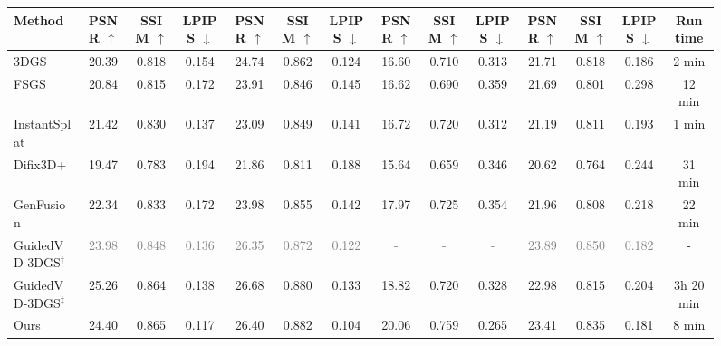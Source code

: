 \documentclass[runningheads]{llncs}
\begin{document}
\begin{figure}[t]
\begin{minipage}{\textwidth}
{\begin{tabular}{lccccccccccccc}
Method
& PSNR $\uparrow$ & SSIM $\uparrow$ & LPIPS $\downarrow$
& PSNR $\uparrow$ & SSIM $\uparrow$ & LPIPS $\downarrow$
& PSNR $\uparrow$ & SSIM $\uparrow$ & LPIPS $\downarrow$
& PSNR $\uparrow$ & SSIM $\uparrow$ & LPIPS $\downarrow$
& Run time \\
\midrule

3DGS & 20.39 & 0.818 & \cellcolor{yellow!25}0.154
& 24.74 & \cellcolor{yellow!25}0.862 & \cellcolor{orange!25}0.124
& 16.60 & 0.710 & 0.313
& 21.71 & \cellcolor{orange!25}0.818 & \cellcolor{orange!25}0.186 
& 2 min \\

FSGS & 20.84 & 0.815 & 0.172
& 23.91 & 0.846 & 0.145
& 16.62 & 0.690 & 0.359
& 21.69 & 0.801 & 0.298 
& 12 min \\

InstantSplat & \cellcolor{yellow!25}21.42 & 0.830 & \cellcolor{orange!25}0.137
& 23.09 & 0.849 & \cellcolor{yellow!25}0.141
& 16.72 & 0.720 & \cellcolor{yellow!25}0.312
& 21.19 & 0.811 & \cellcolor{yellow!25}0.193 
& 1 min \\

Difix3D+ & 19.47 & 0.783 & 0.194
& 21.86 & 0.811 & 0.188
& 15.64 & 0.659 & 0.346
& 20.62 & 0.764 & 0.244 
& 31 min \\

GenFusion & 22.34 & \cellcolor{yellow!25}0.833 & 0.172
& 23.98 & 0.855 & 0.142
& \cellcolor{yellow!25}17.97 & \cellcolor{yellow!25}0.725 & 0.354
& \cellcolor{yellow!25}21.96 & 0.808 & 0.218 
& 22 min \\

GuidedVD-3DGS$^\dagger$
& \textcolor{gray}{23.98} & \textcolor{gray}{0.848} & \textcolor{gray}{0.136}
& \textcolor{gray}{26.35} & \textcolor{gray}{0.872} & \textcolor{gray}{0.122}
& \textcolor{gray}{-} & \textcolor{gray}{-} & \textcolor{gray}{-}
& \textcolor{gray}{23.89} & \textcolor{gray}{0.850} & \textcolor{gray}{0.182} 
& - \\

GuidedVD-3DGS$^\ddagger$
& \cellcolor{red!25}25.26 & \cellcolor{orange!25}0.864 & 0.138
& \cellcolor{red!25}26.68 & \cellcolor{orange!25}0.880 & 0.133
& \cellcolor{orange!25}18.82 & \cellcolor{orange!25}0.720 & \cellcolor{orange!25}0.328
& \cellcolor{orange!25}22.98 & \cellcolor{yellow!25}0.815 & 0.204 
& 3h 20 min \\

Ours
& \cellcolor{orange!25}24.40 & \cellcolor{red!25}0.865 & \cellcolor{red!25}0.117
& \cellcolor{orange!25}26.40 & \cellcolor{red!25}0.882 & \cellcolor{red!25}0.104
& \cellcolor{red!25}20.06 & \cellcolor{red!25}0.759 & \cellcolor{red!25}0.265
& \cellcolor{red!25}23.41 & \cellcolor{red!25}0.835 & \cellcolor{red!25}0.181 
& 8 min \\


\end{tabular}}
\end{minipage}
\end{figure}
\end{document}
